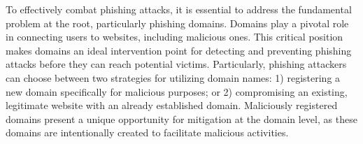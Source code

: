 To effectively combat phishing attacks, it is essential to address the fundamental problem at the root, particularly phishing domains.
Domains play a pivotal role in connecting users to websites, including malicious ones.
This critical position makes domains an ideal intervention point for detecting and preventing phishing attacks before they can reach potential victims.
% 
Particularly, phishing attackers can choose between two strategies for utilizing domain names: 1) registering a new domain specifically for malicious purposes; or 2) compromising an existing, legitimate website with an already established domain. 
Maliciously registered domains present a unique opportunity for mitigation at the domain level, as these domains are intentionally created to facilitate malicious activities. 

